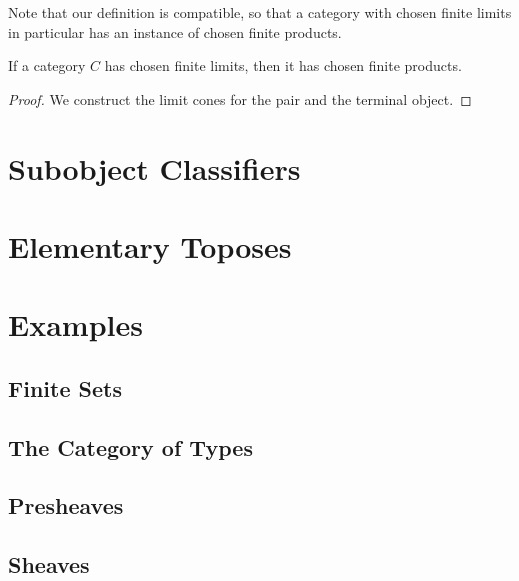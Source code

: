 Note that our definition is compatible, so that a category with chosen finite limits in particular has an instance of chosen finite products.

\begin{lemma}
  \label{lem:chosen-finite-products-from-limits}
If a category $C$ has chosen finite limits, then it has chosen finite products.
\end{lemma}

\begin{proof}
  We construct the limit cones for the pair and the terminal object.
  \leanok
\end{proof}

\section{Subobject Classifiers}
\section{Elementary Toposes}
\section{Examples}
\subsection{Finite Sets}
\subsection{The Category of Types}
\subsection{Presheaves}
\subsection{Sheaves}
